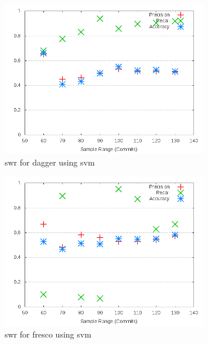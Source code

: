 \begin{figure}[!h]
    \centering
        \includegraphics[width=0.8\textwidth]{images/svm/test_1/dagger_sample_range}
        \caption{\gls{swr} for dagger using \gls{svm}}
        \label{fig:test_1_dagger_svm}
\end{figure}



\begin{figure}[!h]
    \centering
        \includegraphics[width=0.8\textwidth]{images/svm/test_1/fresco_sample_range}
        \caption{\gls{swr} for fresco using \gls{svm}}
        \label{fig:test_1_fresco_svm}
\end{figure}


